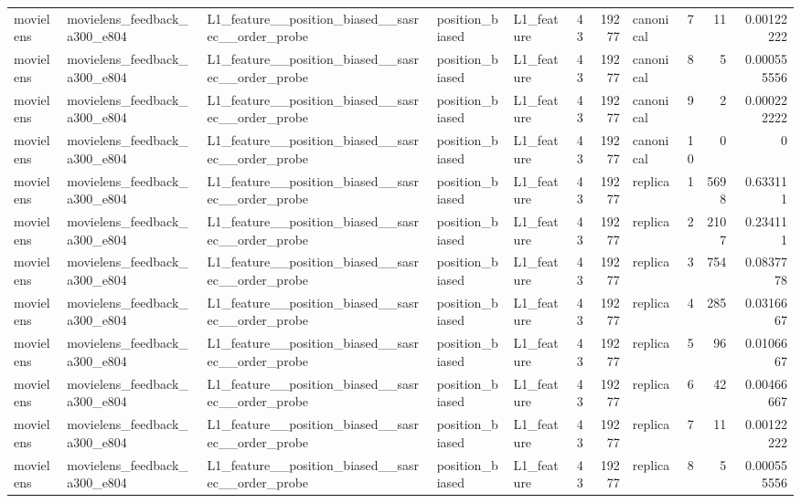 \begin{table}[htbp!]
\begin{tabular}{lllllrrlrrr}
movielens & movielens\_feedback\_a300\_e804 & L1\_feature\_\_position\_biased\_\_sasrec\_\_order\_probe & position\_biased & L1\_feature & 43 & 19277 & canonical & 7 & 11 & 0.00122222 \\
movielens & movielens\_feedback\_a300\_e804 & L1\_feature\_\_position\_biased\_\_sasrec\_\_order\_probe & position\_biased & L1\_feature & 43 & 19277 & canonical & 8 & 5 & 0.000555556 \\
movielens & movielens\_feedback\_a300\_e804 & L1\_feature\_\_position\_biased\_\_sasrec\_\_order\_probe & position\_biased & L1\_feature & 43 & 19277 & canonical & 9 & 2 & 0.000222222 \\
movielens & movielens\_feedback\_a300\_e804 & L1\_feature\_\_position\_biased\_\_sasrec\_\_order\_probe & position\_biased & L1\_feature & 43 & 19277 & canonical & 10 & 0 & 0 \\
movielens & movielens\_feedback\_a300\_e804 & L1\_feature\_\_position\_biased\_\_sasrec\_\_order\_probe & position\_biased & L1\_feature & 43 & 19277 & replica & 1 & 5698 & 0.633111 \\
movielens & movielens\_feedback\_a300\_e804 & L1\_feature\_\_position\_biased\_\_sasrec\_\_order\_probe & position\_biased & L1\_feature & 43 & 19277 & replica & 2 & 2107 & 0.234111 \\
movielens & movielens\_feedback\_a300\_e804 & L1\_feature\_\_position\_biased\_\_sasrec\_\_order\_probe & position\_biased & L1\_feature & 43 & 19277 & replica & 3 & 754 & 0.0837778 \\
movielens & movielens\_feedback\_a300\_e804 & L1\_feature\_\_position\_biased\_\_sasrec\_\_order\_probe & position\_biased & L1\_feature & 43 & 19277 & replica & 4 & 285 & 0.0316667 \\
movielens & movielens\_feedback\_a300\_e804 & L1\_feature\_\_position\_biased\_\_sasrec\_\_order\_probe & position\_biased & L1\_feature & 43 & 19277 & replica & 5 & 96 & 0.0106667 \\
movielens & movielens\_feedback\_a300\_e804 & L1\_feature\_\_position\_biased\_\_sasrec\_\_order\_probe & position\_biased & L1\_feature & 43 & 19277 & replica & 6 & 42 & 0.00466667 \\
movielens & movielens\_feedback\_a300\_e804 & L1\_feature\_\_position\_biased\_\_sasrec\_\_order\_probe & position\_biased & L1\_feature & 43 & 19277 & replica & 7 & 11 & 0.00122222 \\
movielens & movielens\_feedback\_a300\_e804 & L1\_feature\_\_position\_biased\_\_sasrec\_\_order\_probe & position\_biased & L1\_feature & 43 & 19277 & replica & 8 & 5 & 0.000555556 \\

\end{tabular}
\end{table}
